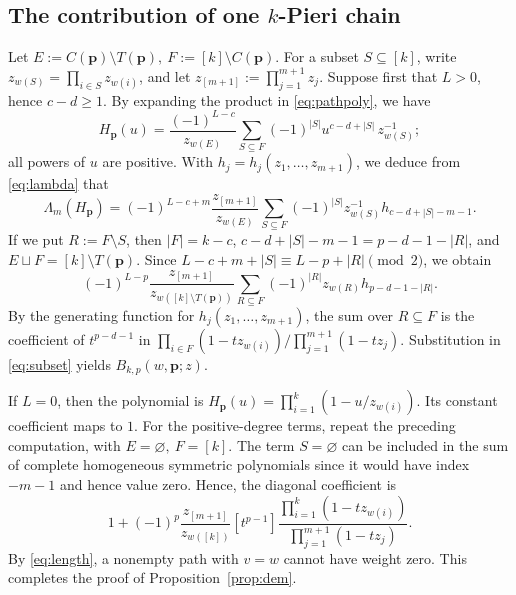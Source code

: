 \documentclass[11pt,a4paper,reqno]{amsart}
\DeclareRobustCommand{\rev}[1]{{\color{revision}#1}}
\numberwithin{equation}{section}
\theoremstyle{definition}
\newcommand{\pp}{\mathbf p}
\begin{document}
\subsection{The contribution of one \texorpdfstring{\(k\)}{k}-Pieri chain}
Let \(E:=C(\pp)\setminus T(\pp),\ F:=[k]\setminus C(\pp)\).
For a subset \(S\subseteq[k]\), write \(z_{w(S)}=\prod_{i\in S}z_{w(i)}\), and let \(z_{[m+1]}:=\prod_{j=1}^{m+1}z_j\).
Suppose first that \(L>0\), hence \(c-d\ge1\). By expanding the product in \eqref{eq:pathpoly}, we have 
\[
 H_{\pp}(u)=
 \frac{(-1)^{L-c}}{z_{w(E)}}\sum_{S\subseteq F}
       (-1)^{|S|}u^{c-d+|S|}\,z_{w(S)}^{-1}; 
\]
all powers of \(u\) are positive. With \(h_j=h_j(z_1,\ldots,z_{m+1})\), we deduce from \eqref{eq:lambda} that 
\[
 \Lambda_m(H_{\pp})=
 (-1)^{L-c+m}\frac{z_{[m+1]}}{z_{w(E)}}
 \sum_{S\subseteq F}(-1)^{|S|}z_{w(S)}^{-1}h_{c-d+|S|-m-1}.
\]
If we put \(R:=F\setminus S\), then \(|F|=k-c\),
\(c-d+|S|-m-1=p-d-1-|R|\), and \(E\sqcup F=[k]\setminus T(\pp)\).
Since \(L-c+m+|S|\equiv L-p+|R|\pmod2\), we obtain
\begin{equation}\label{eq:subset}
 (-1)^{L-p}\frac{z_{[m+1]}}{z_{w([k]\setminus T(\pp))}}
 \sum_{R\subseteq F}(-1)^{|R|}z_{w(R)}h_{p-d-1-|R|}.
\end{equation}
\rev{By the generating function for \(h_j(z_1,\ldots,z_{m+1})\), the sum over \(R\subseteq F\) is the coefficient of \(t^{p-d-1}\) in \(\prod_{i\in F}(1-tz_{w(i)})/\prod_{j=1}^{m+1}(1-tz_j)\). Substitution in \eqref{eq:subset} yields \(B_{k,p}(w,\pp;z)\).}

If \(L=0\), then the polynomial is \(H_{\pp}(u)=\prod_{i=1}^k(1-u/z_{w(i)})\). Its constant coefficient maps to \(1\). For the positive-degree terms, repeat the preceding computation, with \(E=\varnothing,\ F=[k]\). The term \(S=\varnothing\) can be included in the sum of complete homogeneous symmetric polynomials since it would have index \(-m-1\) and hence value zero. Hence, the diagonal coefficient is  
\begin{equation}\label{eq:empty}
 1+(-1)^p\frac{z_{[m+1]}}{z_{w([k])}}
 [t^{p-1}]\frac{\prod_{i=1}^k(1-tz_{w(i)})}{\prod_{j=1}^{m+1}(1-tz_j)} .
\end{equation}
By \eqref{eq:length}, a nonempty path with \(v=w\) cannot have weight zero. This completes the proof of Proposition~\ref{prop:dem}.
\end{document}
